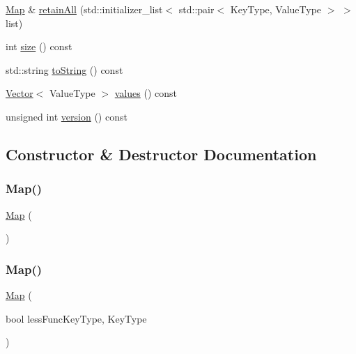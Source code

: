 \begin{DoxyCompactItemize}
\item 
\mbox{\hyperlink{classMap}{Map}} \& \mbox{\hyperlink{classMap_a16d237e15768c6f5f3b7a9f633a6551d}{retain\+All}} (std\+::initializer\+\_\+list$<$ std\+::pair$<$ Key\+Type, Value\+Type $>$ $>$ list)
\item 
int \mbox{\hyperlink{classMap_af9593d4a5ff4274efaf429cb4f9e57cc}{size}} () const
\item 
std\+::string \mbox{\hyperlink{classMap_a1fe5121d6528fdea3f243321b3fa3a49}{to\+String}} () const
\item 
\mbox{\hyperlink{classVector}{Vector}}$<$ Value\+Type $>$ \mbox{\hyperlink{classMap_a50ccbe4184324f0da975648a12728d20}{values}} () const
\item 
unsigned int \mbox{\hyperlink{classMap_a0aa696ccb72cbf928535d6b646bac1aa}{version}} () const
\end{DoxyCompactItemize}


\subsection{Constructor \& Destructor Documentation}
\mbox{\label{classMap_a49848ab3a0e1934c5615242b67af68c7}} 
\subsubsection{\texorpdfstring{Map()}{Map()}\hspace{0.1cm}{\footnotesize\ttfamily [1/8]}}
{\footnotesize\ttfamily \mbox{\hyperlink{classMap}{Map}} (\begin{DoxyParamCaption}{ }\end{DoxyParamCaption})}

\mbox{\label{classMap_ad1ada5d0cc94f69c235f999c2fbc3dff}} 
\subsubsection{\texorpdfstring{Map()}{Map()}\hspace{0.1cm}{\footnotesize\ttfamily [2/8]}}
{\footnotesize\ttfamily \mbox{\hyperlink{classMap}{Map}} (\begin{DoxyParamCaption}\item[{bool }]{less\+FuncKey\+Type, Key\+Type }\end{DoxyParamCaption})}

